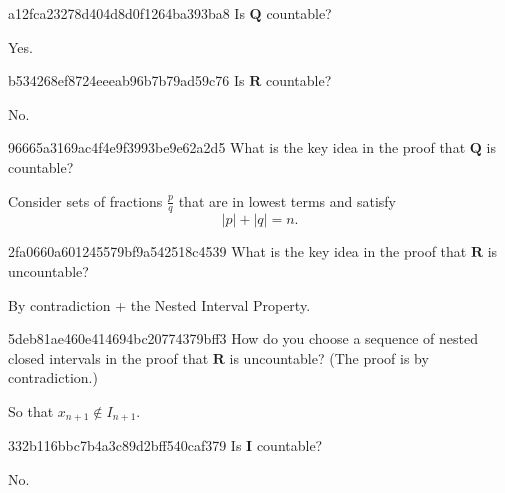 \begin{note}{a12fca23278d404d8d0f1264ba393ba8}
    Is \({ \mathbf{Q} }\) countable?

    \begin{cloze}{1}
        Yes.
    \end{cloze}
\end{note}

\begin{note}{b534268ef8724eeeab96b7b79ad59c76}
    Is \({ \mathbf{R} }\) countable?

    \begin{cloze}{1}
        No.
    \end{cloze}
\end{note}

\begin{note}{96665a3169ac4f4e9f3993be9e62a2d5}
    What is the key idea in the proof that \({ \mathbf{Q} }\) is countable?

    \begin{cloze}{1}
        Consider sets of fractions \({ \frac{p}{q} }\) that are in lowest terms and satisfy
        \[
            \left\lvert p \right\rvert + \left\lvert q \right\rvert = n.
        \]
    \end{cloze}
\end{note}

\begin{note}{2fa0660a601245579bf9a542518c4539}
    What is the key idea in the proof that \({ \mathbf{R} }\) is uncountable?

    \begin{cloze}{1}
        By contradiction + the Nested Interval Property.
    \end{cloze}
\end{note}

\begin{note}{5deb81ae460e414694bc20774379bff3}
    How do you choose a sequence of nested closed intervals in the proof that \({ \mathbf{R} }\) is uncountable?
    (The proof is by contradiction.)

    \begin{cloze}{1}
        So that \({ x_{n + 1} \not\in I_{n + 1} }\).
    \end{cloze}
\end{note}

\begin{note}{332b116bbc7b4a3c89d2bff540caf379}
    Is \({ \mathbf{I} }\) countable?

    \begin{cloze}{1}
        No.
    \end{cloze}
\end{note}

